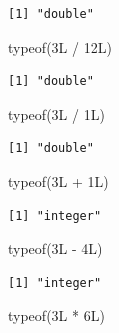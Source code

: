 \documentclass[
  a4paper,
  pandoc,
  ja=standard,
  jafont=haranoaji]{bxjsbook}
\newenvironment{Shaded}{\begin{snugshade}}{\end{snugshade}}
\newcommand{\FunctionTok}[1]{\textcolor[rgb]{0.28,0.35,0.67}{#1}}
\newcommand{\NormalTok}[1]{\textcolor[rgb]{0.00,0.48,0.65}{#1}}
\newcommand{\SpecialCharTok}[1]{\textcolor[rgb]{0.37,0.37,0.37}{#1}}
\begin{document}
\begin{verbatim}
[1] "double"
\end{verbatim}

\begin{Shaded}
\begin{Highlighting}[numbers=left,,]
\FunctionTok{typeof}\NormalTok{(3L }\SpecialCharTok{/}\NormalTok{ 12L)}
\end{Highlighting}
\end{Shaded}

\begin{verbatim}
[1] "double"
\end{verbatim}

\begin{Shaded}
\begin{Highlighting}[numbers=left,,]
\FunctionTok{typeof}\NormalTok{(3L }\SpecialCharTok{/}\NormalTok{ 1L)}
\end{Highlighting}
\end{Shaded}

\begin{verbatim}
[1] "double"
\end{verbatim}

\begin{Shaded}
\begin{Highlighting}[numbers=left,,]
\FunctionTok{typeof}\NormalTok{(3L }\SpecialCharTok{+}\NormalTok{ 1L)}
\end{Highlighting}
\end{Shaded}

\begin{verbatim}
[1] "integer"
\end{verbatim}

\begin{Shaded}
\begin{Highlighting}[numbers=left,,]
\FunctionTok{typeof}\NormalTok{(3L }\SpecialCharTok{{-}}\NormalTok{ 4L)}
\end{Highlighting}
\end{Shaded}

\begin{verbatim}
[1] "integer"
\end{verbatim}

\begin{Shaded}
\begin{Highlighting}[numbers=left,,]
\FunctionTok{typeof}\NormalTok{(3L }\SpecialCharTok{*}\NormalTok{ 6L)}
\end{Highlighting}
\end{Shaded}
\end{document}

